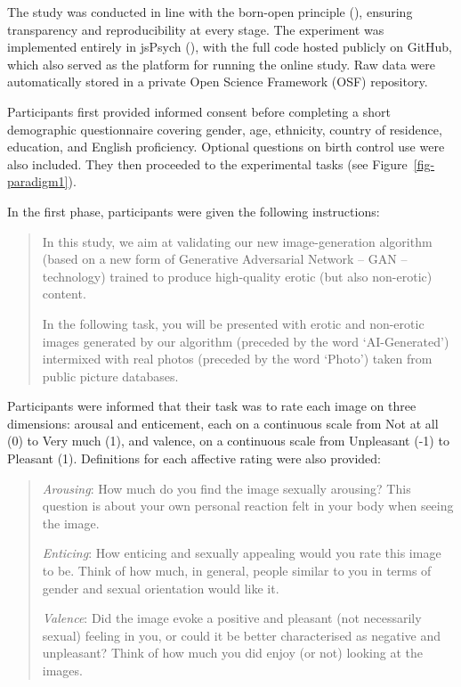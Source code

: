 \documentclass[
  jou,
  floatsintext,
  longtable,
  nolmodern,
  notxfonts,
  notimes,
  colorlinks=true,linkcolor=blue,citecolor=blue,urlcolor=blue]{apa7}
\begin{document}
The study was conducted in line with the born-open principle
(), ensuring transparency and
reproducibility at every stage. The experiment was implemented entirely
in jsPsych (), with the full
code hosted publicly on GitHub, which also served as the platform for
running the online study. Raw data were automatically stored in a
private Open Science Framework (OSF) repository.

Participants first provided informed consent before completing a short
demographic questionnaire covering gender, age, ethnicity, country of
residence, education, and English proficiency. Optional questions on
birth control use were also included. They then proceeded to the
experimental tasks (see Figure~\ref{fig-paradigm1}).

In the first phase, participants were given the following instructions:

\begin{quote}
In this study, we aim at validating our new image-generation algorithm
(based on a new form of Generative Adversarial Network -- GAN --
technology) trained to produce high-quality erotic (but also non-erotic)
content.

In the following task, you will be presented with erotic and non-erotic
images generated by our algorithm (preceded by the word `AI-Generated')
intermixed with real photos (preceded by the word `Photo') taken from
public picture databases.
\end{quote}

Participants were informed that their task was to rate each image on
three dimensions: arousal and enticement, each on a continuous scale
from Not at all (0) to Very much (1), and valence, on a continuous scale
from Unpleasant (-1) to Pleasant (1). Definitions for each affective
rating were also provided:

\begin{quote}
\emph{Arousing}: How much do you find the image sexually arousing? This
question is about your own personal reaction felt in your body when
seeing the image.

\emph{Enticing}: How enticing and sexually appealing would you rate this
image to be. Think of how much, in general, people similar to you in
terms of gender and sexual orientation would like it.

\emph{Valence}: Did the image evoke a positive and pleasant (not
necessarily sexual) feeling in you, or could it be better characterised
as negative and unpleasant? Think of how much you did enjoy (or not)
looking at the images.
\end{quote}
\end{document}
